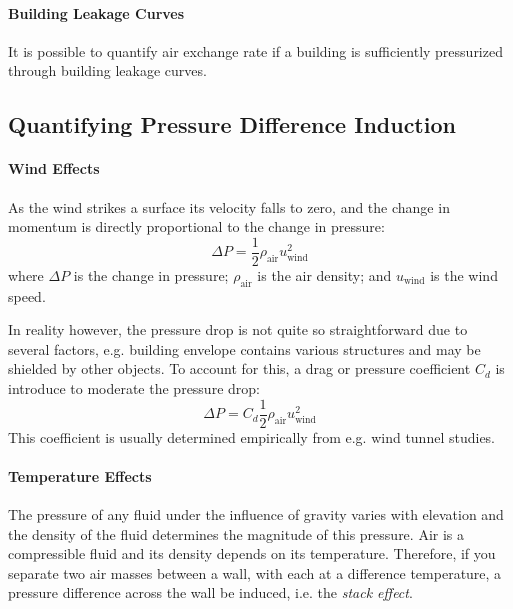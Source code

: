 \paragraph{Building Leakage Curves}

It is possible to quantify air exchange rate if a building is sufficiently pressurized through building leakage curves.

\subsection{Quantifying Pressure Difference Induction}\label{sec:quantifying_pressure}


\paragraph{Wind Effects}

As the wind strikes a surface its velocity falls to zero, and the change in momentum is directly proportional to the change in pressure:
\begin{equation}\label{eq:wind_pressure_uncorrected}
  \Delta P = \frac{1}{2} \rho_\mathrm{air} u_\mathrm{wind}^2
\end{equation}
where $\Delta P$ is the change in pressure; $\rho_\mathrm{air}$ is the air density; and $u_\mathrm{wind}$ is the wind speed.\par

In reality however, the pressure drop is not quite so straightforward due to several factors, e.g. building envelope contains various structures and may be shielded by other objects.
To account for this, a drag or pressure coefficient $C_d$ is introduce to moderate the pressure drop:
\begin{equation}\label{eq:wind_pressure}
  \Delta P = C_d \frac{1}{2} \rho_\mathrm{air} u_\mathrm{wind}^2
\end{equation}
This coefficient is usually determined empirically from e.g. wind tunnel studies.

\paragraph{Temperature Effects}

The pressure of any fluid under the influence of gravity varies with elevation and the density of the fluid determines the magnitude of this pressure.
Air is a compressible fluid and its density depends on its temperature.
Therefore, if you separate two air masses between a wall, with each at a difference temperature, a pressure difference across the wall be induced, i.e. the \textit{stack effect}.

